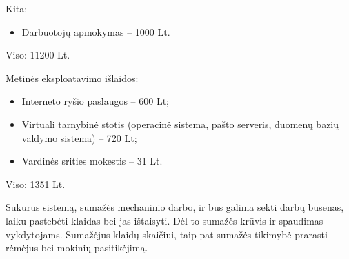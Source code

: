 Kita:
\begin{itemize}
  \item Darbuotoj\k{u} apmokymas – 1000 Lt.
\end{itemize}

Viso: 11200 Lt.

Metin\.{e}s eksploatavimo išlaidos:
\begin{itemize}
  \item Interneto ryšio paslaugos – 600 Lt;
  \item Virtuali tarnybin\.{e} stotis (operacin\.{e} sistema, pašto 
    serveris, duomen\k{u} bazi\k{u} valdymo sistema) – 720 Lt;
  \item Vardin\.{e}s srities mokestis – 31 Lt.
\end{itemize}

Viso: 1351 Lt.

Sukūrus sistemą, sumažės mechaninio darbo, ir bus galima sekti 
darbų būsenas, laiku pastebėti klaidas bei jas ištaisyti. Dėl 
to sumažės krūvis ir spaudimas vykdytojams. Sumažėjus klaidų 
skaičiui, taip pat sumažės tikimybė prarasti rėmėjus bei 
mokinių pasitikėjimą. 

